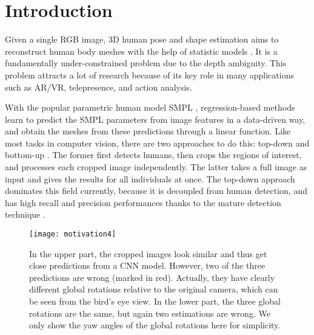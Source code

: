 \documentclass[runningheads]{llncs}
\begin{document}
\section{Introduction}
\label{sec:intro}

Given a single RGB image, 3D human pose and shape estimation aims to reconstruct human body meshes with the help of statistic models \cite{anguelov2005scape,loper2015smpl,osman2020star,xu2020ghum}.
It is a fundamentally under-constrained problem due to the depth ambiguity.
This problem attracts a lot of research because of its key role in many applications such as AR/VR, telepresence, and action analysis.

With the popular parametric human model SMPL \cite{loper2015smpl}, regression-based methods \cite{kanazawa2018end,kocabas2021pare,moon2020pose2pose} learn to predict the SMPL parameters from image features in a data-driven way, and obtain the meshes from these predictions through a linear function.
Like most tasks in computer vision, there are two approaches to do this: top-down \cite{kanazawa2018end,kolotouros2019learning,kocabas2020vibe,kocabas2021pare} and bottom-up \cite{sun2021monocular,zhang2021bmp}.
The former first detects humans, then crops the regions of interest, and processes each cropped image independently.
The latter takes a full image as input and gives the results for all individuals at once.
The top-down approach dominates this field currently, because it is decoupled from human detection, and has high recall and precision performances thanks to the mature detection technique \cite{redmon2018yolov3,ren2015faster,chen2019hybrid}.

\begin{figure}[t]
	\centering
	\texttt{[image: motivation4]}
	\caption{In the upper part, the cropped images look similar and thus get close predictions from a CNN model. However, two of the three predictions are wrong (marked in red). Actually, they have clearly different global rotations relative to the original camera, which can be seen from the bird's eye view.
	In the lower part, the three global rotations are the same, but again two estimations are wrong.
	We only show the yaw angles of the global rotations here for simplicity.}
	\label{fig:motivation}
\end{figure}
\end{document}
